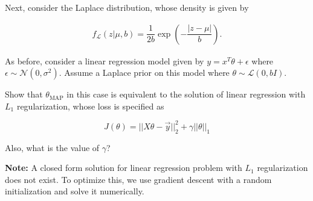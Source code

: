 \item {} Next, consider the Laplace distribution, whose density is
given by

\begin{align*}
  f_{\mathcal{L}}(z|\mu ,b)={\dfrac{1}{2b}}
  \exp \left(-{\dfrac{|z-\mu |}{b}}\right).
\end{align*}


As before, consider a linear regression model given by
$y=x^T\theta+\epsilon$ where $\epsilon \sim \mathcal{N}(0,\sigma^2)$. Assume a Laplace
prior on this model where $\theta \sim \mathcal{L}(0,b I)$.

Show that $\theta_\text{MAP}$ in this case is equivalent to the solution of linear
regression with $L_1$ regularization, whose loss is specified as

$$J(\theta) = || X\theta - \vec{y} ||_2^2 + \gamma ||\theta||_1 $$

Also, what is the value of $\gamma$?

\ifnum{} {
  
} \fi


\textbf{Note:} A closed form solution for linear regression problem with $L_1$ regularization
does not exist. To optimize this, we use gradient descent with a random initialization
and solve it numerically.
